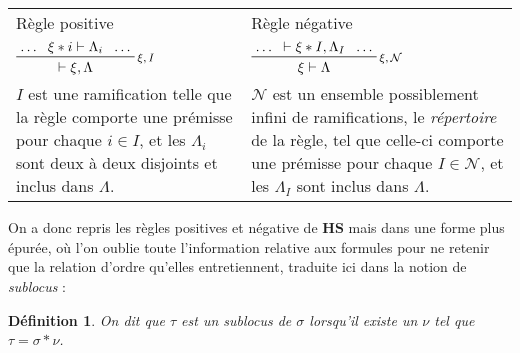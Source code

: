 \documentclass[12pt]{report}
\newcommand{\seq}{\vdash}
\newcommand{\irule}[1]{\footnotesize$#1$}
\newtheorem{definition}{Définition}
\begin{document}
\begin{longtabu}{p{17em}p{17em}}
	\rowfont{\centering\bfseries}
	Règle positive\vspace{3mm} &
	Règle négative\vspace{3mm} \\
	\rowfont{\centering}
	$\prftree[r]{\irule{\xi,I}}
		{\ldots}
		{\xi \ast i \seq \Lambda_i}
		{\ldots}
		{\seq \xi,\Lambda}$ &
	$\prftree[r]{\irule{\xi,\mathcal{N}}}
		{\ldots}
		{\seq \xi \ast I,\Lambda_I}
		{\ldots}
		{\xi \seq \Lambda}$ \\
	\rowfont{\footnotesize}
	$I$ est une ramification telle que la règle comporte une prémisse pour chaque $i \in I$, et les $\Lambda_i$ sont deux à deux disjoints et inclus dans $\Lambda$. &
	$\mathcal{N}$ est un ensemble possiblement infini de ramifications, le \emph{répertoire} de la règle, tel que celle-ci comporte une prémisse pour chaque $I \in \mathcal{N}$, et les $\Lambda_I$ sont inclus dans $\Lambda$.
\end{longtabu}

On a donc repris les règles positives et négative de $\mathbf{HS}$ mais dans une forme plus épurée, où l'on oublie toute l'information relative aux formules pour ne retenir que la relation d'ordre qu'elles entretiennent, traduite ici dans la notion de \emph{sublocus} :
\begin{definition}
	On dit que $\tau$ est un \emph{sublocus} de $\sigma$ lorsqu'il existe un $\nu$ tel que $\tau = \sigma \ast \nu$.
\end{definition}
\end{document}
